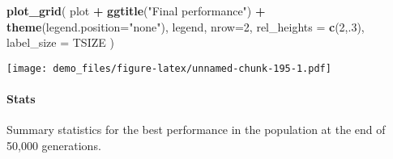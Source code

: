 \documentclass[]{book}
\newenvironment{Shaded}{\begin{snugshade}}{\end{snugshade}}
\newcommand{\DataTypeTok}[1]{\textcolor[rgb]{0.13,0.29,0.53}{#1}}
\newcommand{\DecValTok}[1]{\textcolor[rgb]{0.00,0.00,0.81}{#1}}
\newcommand{\KeywordTok}[1]{\textcolor[rgb]{0.13,0.29,0.53}{\textbf{#1}}}
\newcommand{\NormalTok}[1]{#1}
\newcommand{\OperatorTok}[1]{\textcolor[rgb]{0.81,0.36,0.00}{\textbf{#1}}}
\newcommand{\OtherTok}[1]{\textcolor[rgb]{0.56,0.35,0.01}{#1}}
\newcommand{\StringTok}[1]{\textcolor[rgb]{0.31,0.60,0.02}{#1}}
\let\oldparagraph\paragraph
\renewcommand{\paragraph}[1]{\oldparagraph{#1}\mbox{}}
\begin{document}
\begin{Shaded}
\begin{Highlighting}[]
\KeywordTok{plot_grid}\NormalTok{(}
\NormalTok{  plot }\OperatorTok{+}
\StringTok{    }\KeywordTok{ggtitle}\NormalTok{(}\StringTok{"Final performance"}\NormalTok{) }\OperatorTok{+}
\StringTok{    }\KeywordTok{theme}\NormalTok{(}\DataTypeTok{legend.position=}\StringTok{"none"}\NormalTok{),}
\NormalTok{  legend,}
  \DataTypeTok{nrow=}\DecValTok{2}\NormalTok{,}
  \DataTypeTok{rel_heights =} \KeywordTok{c}\NormalTok{(}\DecValTok{2}\NormalTok{,.}\DecValTok{3}\NormalTok{),}
  \DataTypeTok{label_size =}\NormalTok{ TSIZE}
\NormalTok{)}
\end{Highlighting}
\end{Shaded}

\texttt{[image: demo\_files/figure-latex/unnamed-chunk-195-1.pdf]}

\hypertarget{stats-83}{%
\paragraph{Stats}\label{stats-83}}

Summary statistics for the best performance in the population at the end of 50,000 generations.

\begin{Shaded}
\end{Shaded}
\end{document}
